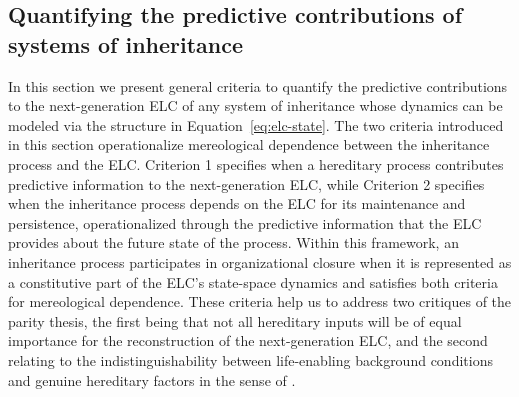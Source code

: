 \documentclass[pdflatex,sn-mathphys-num]{sn-jnl}
\theoremstyle{thmstylethree}
\theoremstyle{thmstyleone}
\newcommand{\ELC}{\mathrm{ELC}}
\begin{document}
\subsection{Quantifying the predictive contributions of systems of inheritance} 
In this section we present general criteria to quantify the predictive contributions to the next-generation ELC of any system of inheritance whose dynamics can be modeled via the structure in Equation~\ref{eq:elc-state}. The two criteria introduced in this section operationalize mereological dependence between the inheritance process and the ELC. Criterion 1 specifies when a  hereditary process contributes predictive information to the next-generation ELC, while Criterion 2 specifies when the inheritance process depends on the ELC for its maintenance and persistence, operationalized through the predictive information that the ELC provides about the future state of the process. Within this framework, an inheritance process participates in organizational closure when it is represented as a constitutive part of the ELC's state-space dynamics and satisfies both criteria for mereological dependence. These criteria help us to address two critiques of the parity thesis, the first being that not all hereditary inputs will be of equal importance for the reconstruction of the next-generation ELC, and the second relating to the indistinguishability between life-enabling background conditions and genuine hereditary factors in the sense of \cite{veigl2022rethinking}. %

 

\end{document}
